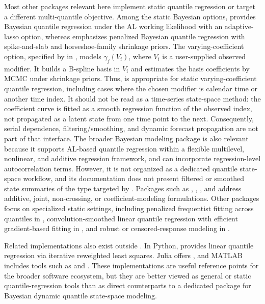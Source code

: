 \documentclass{jss}
\begin{document}
Most other  packages relevant here implement static quantile regression or target a different multi-quantile objective. Among the static Bayesian options,  \citep{bayesQR} provides Bayesian quantile regression under the AL working likelihood with an adaptive-lasso option, whereas  \citep{pqrBayes} emphasizes penalized Bayesian quantile regression with spike-and-slab and horseshoe-family shrinkage priors. The varying-coefficient option, specified by  in , models \(\gamma_j(V_i)\), where \(V_i\) is a user-supplied observed modifier. It builds a B-spline basis in \(V_i\) and estimates the basis coefficients by MCMC under shrinkage priors. Thus,  is appropriate for static varying-coefficient quantile regression, including cases where the chosen modifier is calendar time or another time index. It should not be read as a time-series state-space method: the coefficient curve is fitted as a smooth regression function of the observed index, not propagated as a latent state from one time point to the next. Consequently, serial dependence, filtering/smoothing, and dynamic forecast propagation are not part of that interface. The broader Bayesian modeling package  \citep{brmsfamily} is also relevant because it supports AL-based quantile regression within a flexible multilevel, nonlinear, and additive regression framework, and can incorporate regression-level autocorrelation terms. However, it is not organized as a dedicated quantile state-space workflow, and its documentation does not present filtered or smoothed state summaries of the type targeted by . Packages such as  \citep{qgam},  \citep{qrjoint},  \citep{quantregGrowth}, and  \citep{qrcm} address additive, joint, non-crossing, or coefficient-modeling formulations. Other packages focus on specialized static settings, including penalized frequentist fitting across quantiles in  \citep{rqPen}, convolution-smoothed linear quantile regression with efficient gradient-based fitting in  \citep{conquer}, and robust or censored-response modeling in  \citep{lqr}.

Related implementations also exist outside . In Python,  \citep{statsmodelsQuantReg} provides linear quantile regression via iterative reweighted least squares. Julia offers  \citep{QuantRegjl}, and MATLAB includes tools such as  and  \citep{matlabQuantile}. These implementations are useful reference points for the broader software ecosystem, but they are better viewed as general or static quantile-regression tools than as direct counterparts to a dedicated package for Bayesian dynamic quantile state-space modeling.
\end{document}

